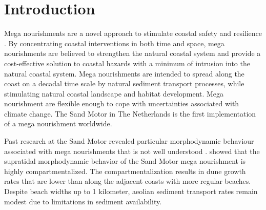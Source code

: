 \section{Introduction}

Mega nourishments are a novel approach to stimulate coastal safety and
resilience \citep{Stive2013}. By concentrating coastal interventions
in both time and space, mega nourishments are believed to strengthen
the natural coastal system and provide a cost-effective solution to
coastal hazards with a minimum of intrusion into the natural coastal
system. Mega nourishments are intended to spread along the coast on a
decadal time scale by natural sediment transport processes, while
stimulating natural coastal landscape and habitat development. Mega
nourishment are flexible enough to cope with uncertainties associated
with climate change. The Sand Motor in The Netherlands is the first
implementation of a mega nourishment worldwide.

Past research at the Sand Motor revealed particular morphodynamic
behaviour associated with mega nourishments that is not well
understood \citep{deSchipper2016, Huisman2016,
  Radermacher2017}. \citet{Hoonhout2017a} showed that the supratidal
morphodynamic behavior of the Sand Motor mega nourishment is highly
compartmentalized. The compartmentalization results in dune growth
rates that are lower than along the adjacent coasts with more regular
beaches. Despite beach widths up to 1 kilometer, aeolian sediment
transport rates remain modest due to limitations in sediment
availability.






